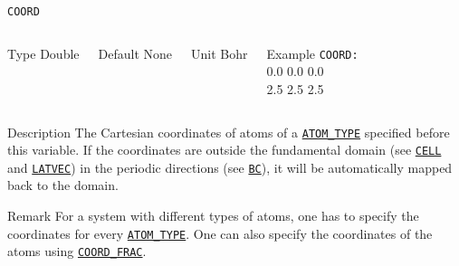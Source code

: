 \begin{frame}[allowframebreaks]{\texttt{COORD}} \label{COORD}
\vspace*{-12pt}
\begin{columns}
\begin{block}{Type}
Double
\end{block}

\begin{block}{Default}
None
\end{block}

\begin{block}{Unit}
Bohr
\end{block}

\begin{block}{Example}
\texttt{COORD: \\}
0.0 0.0 0.0 \\
2.5 2.5 2.5
\end{block}
\end{columns}

\begin{block}{Description}
The Cartesian coordinates of atoms of a \hyperlink{ATOM_TYPE}{\texttt{ATOM\_TYPE}} specified before this variable. If the coordinates are outside the fundamental domain (see \hyperlink{CELL}{\texttt{CELL}} and \hyperlink{LATVEC}{\texttt{LATVEC}}) in the periodic directions (see \hyperlink{BC}{\texttt{BC}}), it will be automatically mapped back to the domain.
\end{block}

\begin{block}{Remark}
For a system with different types of atoms, one has to specify the coordinates for every \hyperlink{ATOM_TYPE}{\texttt{ATOM\_TYPE}}. One can also specify the coordinates of the atoms using \hyperlink{COORD_FRAC}{\texttt{COORD\_FRAC}}.
\end{block}

\end{frame}



